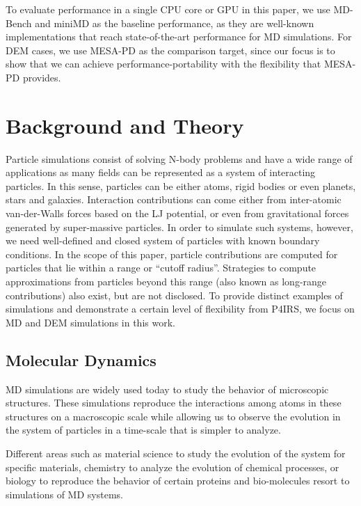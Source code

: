 \documentclass[preprint,12pt]{elsarticle}
\begin{document}
To evaluate performance in a single CPU core or GPU in this paper, we use MD-Bench and miniMD as the baseline performance, as they are well-known implementations that reach state-of-the-art performance for MD simulations.
For DEM cases, we use MESA-PD as the comparison target, since our focus is to show that we can achieve performance-portability with the flexibility that MESA-PD provides. 

\section{Background and Theory}
\label{sec:background}

Particle simulations consist of solving N-body problems and have a wide range of applications as many fields can be represented as a system of interacting particles.
In this sense, particles can be either atoms, rigid bodies or even planets, stars and galaxies.
Interaction contributions can come either from inter-atomic van-der-Walls forces based on the \ac{LJ} potential, or even from gravitational forces generated by super-massive particles.
In order to simulate such systems, however, we need well-defined and closed system of particles with known boundary conditions.
In the scope of this paper, particle contributions are computed for particles that lie within a range or ``cutoff radius''. 
Strategies to compute approximations from particles beyond this range (also known as long-range contributions) also exist, but are not disclosed.
To provide distinct examples of simulations and demonstrate a certain level of flexibility from P4IRS, we focus on MD and DEM simulations in this work.

\subsection{Molecular Dynamics}
\label{sec:md}

\ac{MD} simulations are widely used today to study the behavior of microscopic structures.
These simulations reproduce the interactions among atoms in these structures on a macroscopic scale while allowing us to observe the evolution in the system of particles in a time-scale that is simpler to analyze.

Different areas such as material science to study the evolution of the system for specific materials, chemistry to analyze the evolution of chemical processes, or biology to reproduce the behavior of certain proteins and bio-molecules resort to simulations of \ac{MD} systems.
\end{document}
